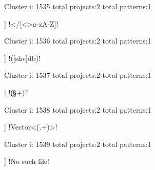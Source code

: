 Cluster i: 1535
total projects:2
total patterns:1
\begin{multicols}{1}
\begin{description}[noitemsep,topsep=0pt]
\item [[2] ] \cverb!</[<>a-zA-Z]!
\end{description}
\end{multicols}







Cluster i: 1536
total projects:2
total patterns:1
\begin{multicols}{1}
\begin{description}[noitemsep,topsep=0pt]
\item [[2] ] \cverb!([shv]db)\s!
\end{description}
\end{multicols}







Cluster i: 1537
total projects:2
total patterns:1
\begin{multicols}{1}
\begin{description}[noitemsep,topsep=0pt]
\item [[2] ] \cverb!\|(\S+)\|!
\end{description}
\end{multicols}







Cluster i: 1538
total projects:2
total patterns:1
\begin{multicols}{1}
\begin{description}[noitemsep,topsep=0pt]
\item [[2] ] \cverb!Vector<(.+)>!
\end{description}
\end{multicols}







Cluster i: 1539
total projects:2
total patterns:1
\begin{multicols}{1}
\begin{description}[noitemsep,topsep=0pt]
\item [[2] ] \cverb!No such file!
\end{description}
\end{multicols}







